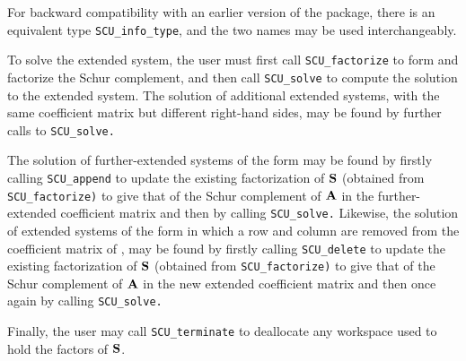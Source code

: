 \documentclass{galahad}
\newcommand{\packagename}{SCU}
\begin{document}
\noindent
For backward compatibility with an earlier version of the package, there
is an equivalent type {\tt \packagename\_info\_type}, and the two names
may be used interchangeably.


\galarguments
To solve the extended system, 
the user must first call {\tt \packagename\_factorize} to form and factorize 
the Schur complement, 
and then call {\tt \packagename\_solve} to compute the solution to the extended 
system. The solution of additional extended systems, with the 
same coefficient matrix but different right-hand sides, may 
be found by further calls to 
{\tt \packagename\_solve.} 

The solution of further-extended systems of the form 
may be found by firstly calling {\tt \packagename\_append} to update the 
existing factorization of ${\mathbf{S}}$ 
(obtained from {\tt \packagename\_factorize)} to give that of 
the Schur complement of $ {\mathbf{A}}$ 
in the further-extended coefficient matrix and then by calling 
{\tt \packagename\_solve.} 
Likewise, the solution of extended systems of the form 
in which a row and column are removed from the 
coefficient matrix of , 
may be found by firstly calling {\tt \packagename\_delete} to update the 
existing factorization of ${\mathbf{S}}$ 
(obtained from {\tt \packagename\_factorize)} to give that of 
the Schur complement of $ {\mathbf{A}}$ 
in the new extended coefficient matrix and then once again by calling 
{\tt \packagename\_solve.} 

Finally, the user may call {\tt \packagename\_terminate} 
to deallocate any workspace used to hold the factors of ${\mathbf{S}}$. 
\end{document}
